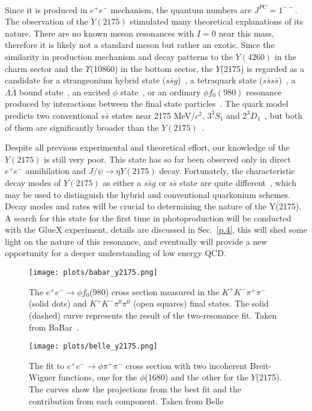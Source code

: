 ~\par Since it is produced in $e^+e^-$ mechanism, the quantum numbers are $J^{PC} = 1^{--}$. The observation of the $Y(2175)$ stimulated many theoretical explanations of its nature. There are no known meson resonances with $I = 0$ near this mass, therefore it is likely not a standard meson but rather an exotic. Since the similarity in production mechanism and decay patterns to the $Y(4260)$ in the charm sector and the $\Upsilon$(10860) in the bottom sector, the $Y$(2175) is regarded as a candidate for a strangeonium hybrid state ($s\bar{s}g$)~\cite{10}, a tetraquark state ($s\bar{s}s\bar{s}$)~\cite{22}, a $\Lambda \bar{\Lambda}$ bound state~\cite{23}, an excited $\phi$ state~\cite{24}, or an ordinary $\phi f_0(980)$ resonance produced by interactions between the final state particles~\cite{25}. The quark model predicts two conventional $s\bar{s}$ states near 2175 MeV/$c^2$, ${3}^{3}\!S_{1}$ and ${2}^{3}\!D_{1}$~\cite{26, 27}, but both of them are significantly broader than the $Y(2175)$~\cite{28, 29}.
~\par Despite all previous experimental and theoretical effort, our knowledge of the $Y(2175)$ is still very poor. This state has so far been observed only in direct $e^{+}e^{-}$ annihilation and $J/\psi \rightarrow \eta Y(2175)$ decay. Fortunately, the characteristic decay modes of $Y(2175)$ as either a $s\bar{s}g$ or $s\bar{s}$ state are quite different~\cite{10, 13}, which may be used to distinguish the hybrid and conventional quarkonium schemes. Decay modes and rates will be crucial to determining the nature of the Y(2175). A search for this state for the first time in photoproduction will be conducted with the GlueX experiment, details are discussed in Sec.~\ref{p.4}, this will shed some light on the nature of this resonance, and eventually will provide a new opportunity for a deeper understanding of low energy QCD.

\begin{figure}[H]
    \centering
        \texttt{[image: plots/babar\_y2175.png]}
        \caption{The $e^+e^- \rightarrow \phi f_0$(980) cross section measured in the $K^{+}K^{-}\pi^{+}\pi^{-}$ (solid dots) and $K^{+}K^{-}\pi^{0}\pi^{0}$ (open squares) final states. The solid (dashed) curve represents the result of the two-resonance fit. Taken from BaBar~\cite{16}.}
        \label{fig.1.4.1}
\end{figure}

\begin{figure}[H]
    \centering
        \texttt{[image: plots/belle\_y2175.png]}
        \caption{The fit to $e^+e^- \rightarrow \phi \pi^+\pi^-$ cross section with two incoherent Breit-Wigner functions, one for the $\phi$(1680) and the other for the $Y$(2175). The curves show the projections from the best fit and the contribution from each component. Taken from Belle~\cite{18}}
        \label{fig.1.4.2}
\end{figure}

